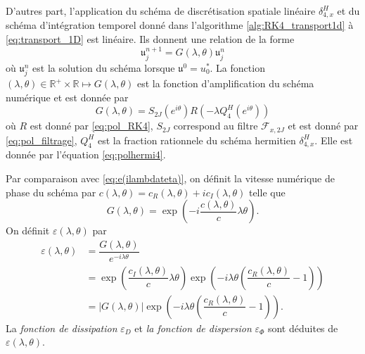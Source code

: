 D'autres part, l'application du schéma de discrétisation spatiale linéaire $\delta_{4,x}^H$ et du schéma d'intégration temporel donné dans l'algorithme \ref{alg:RK4_transport1d} à \eqref{eq:transport_1D} est linéaire. Ils donnent une relation de la forme
\begin{equation}
\mathfrak{u}_j^{n+1} = G(\lambda, \theta) \mathfrak{u}_j^n
\end{equation}
où $\mathfrak{u}_j^n$ est la solution du schéma lorsque $\mathfrak{u}^0 = u_0^*$. La fonction $(\lambda, \theta) \in \mathbb{R}^+ \times \mathbb{R} \mapsto G(\lambda,\theta)$ est la fonction d'amplification du schéma numérique et est donnée par
\begin{equation}
G(\lambda, \theta) = S_{2J}(e^{i \theta}) R(- \lambda Q^H_{4}(e^{i \theta}) )
\end{equation}
où $R$ est donné par \eqref{eq:pol_RK4}, $S_{2J}$ correspond au filtre $\mathcal{F}_{x,2J}$ et est donné par \eqref{eq:pol_filtrage}, $Q_4^H$ est la fraction rationnele du schéma hermitien $\delta_{4,x}^H$. Elle est donnée par l'équation \eqref{eq:polhermi4}.

Par comparaison avec \eqref{eq:e(ilambdateta)}, on définit la  vitesse numérique de phase du schéma par $c(\lambda,\theta) = c_R(\lambda,\theta) + i c_I(\lambda,\theta)$ telle que
\begin{equation}
G(\lambda, \theta) = \exp \left( - i \dfrac{c(\lambda,\theta)}{c} \lambda \theta \right).
\end{equation}
On définit $\varepsilon(\lambda, \theta)$ par
\begin{align*}
\varepsilon(\lambda,\theta) & = \dfrac{G(\lambda,\theta)}{e^{- i \lambda \theta}} \\
	& = \exp \left( \dfrac{c_I(\lambda, \theta)}{c} \lambda \theta \right) \exp \left( - i \lambda \theta \left( \dfrac{c_R(\lambda, \theta)}{c} -1 \right) \right) \\
	& = |G(\lambda, \theta)| \exp \left( - i \lambda \theta \left( \dfrac{c_R(\lambda, \theta)}{c} -1 \right) \right).
\end{align*}
La \textit{fonction de dissipation} $\varepsilon_D$ et \textit{la fonction de dispersion} $\varepsilon_{\Phi}$ sont déduites de $\varepsilon(\lambda, \theta)$.

